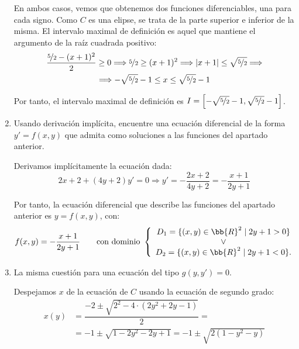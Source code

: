 \begin{ejercicio}
\begin{enumerate}
        En ambos casos, vemos que obtenemos dos funciones diferenciables, una para cada signo. Como $C$ es una elipse, se trata de la parte superior e inferior de la misma. El intervalo maximal de definición es aquel que mantiene el argumento de la raíz cuadrada positivo:
        \begin{multline*}
            \dfrac{\nicefrac{5}{2} - (x+1)^2}{2} \geq 0 \Longrightarrow \nicefrac{5}{2} \geq (x+1)^2 \Longrightarrow |x+1|\leq \sqrt{\nicefrac{5}{2}}
            \Longrightarrow \\ \Longrightarrow
            -\sqrt{\nicefrac{5}{2}}-1 \leq x \leq \sqrt{\nicefrac{5}{2}}-1
        \end{multline*}

        Por tanto, el intervalo maximal de definición es $I=\left[-\sqrt{\nicefrac{5}{2}}-1, \sqrt{\nicefrac{5}{2}}-1\right]$.
        \item Usando derivación implícita, encuentre una ecuación diferencial de la forma \(y' = f(x, y)\) que admita como soluciones a las funciones del apartado anterior.
        
        Derivamos implícitamente la ecuación dada:
        \begin{equation*}
            2x +2+(4y+2)y' = 0 \Longrightarrow y' = -\dfrac{2x+2}{4y+2} = -\dfrac{x+1}{2y+1}
        \end{equation*}

        Por tanto, la ecuación diferencial que describe las funciones del apartado anterior es $y=f(x, y)$, con:
        \begin{equation*}
            f(x, y) = -\dfrac{x+1}{2y+1} \qquad \text{con dominio } \left\{\begin{array}{c}
                D_1=\{(x, y)\in \bb{R}^2 \mid 2y+1>0\}\\
                \lor \\
                D_2=\{(x, y)\in \bb{R}^2 \mid 2y+1<0\}.\\
            \end{array}\right.
        \end{equation*}
        \item La misma cuestión para una ecuación del tipo \(g(y, y') = 0\).
        
        Despejamos $x$ de la ecuación de $C$ usando la ecuación de segundo grado:
        \begin{align*}
            x(y) &= \dfrac{-2\pm \sqrt{2^2 - 4\cdot (2y^2+2y-1)}}{2}
            =\\&= -1 \pm \sqrt{1 - 2y^2-2y+1} = -1 \pm \sqrt{2(1-y^2-y)}
        \end{align*}


\end{enumerate}
\end{ejercicio}
